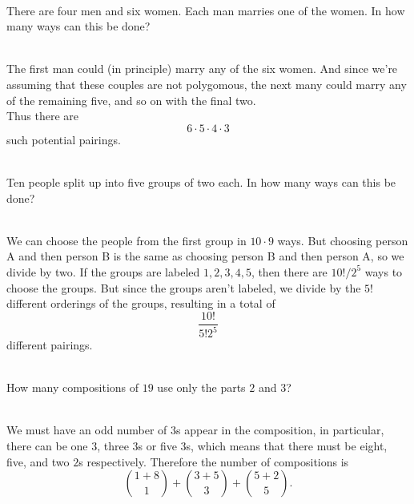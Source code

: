 \documentclass{article}
\newenvironment{problem}[2][Problem]{\begin{trivlist}
\item[\hskip \labelsep {\bfseries #1}\hskip \labelsep {\bfseries #2.}]}{\end{trivlist}}
\newenvironment{solution}[1][Solution.]{\begin{trivlist}
\item[\hskip \labelsep {\bfseries #1}]}{\end{trivlist}}
\begin{document}
\begin{problem}{2 (f)} \text{} \\
  There are four men and six women. Each man marries one of the women.
  In how many ways can this be done?
\end{problem}

\begin{solution} \text{} \\
  The first man could (in principle) marry any of the six women. And since
  we're assuming that these couples are not polygomous, the next many could
  marry any of the remaining five, and so on with the final two.\\
  Thus there are \[
    6\cdot5\cdot4\cdot3
  \] such potential pairings.
\end{solution}

\begin{problem}{2 (g)} \text{} \\
  Ten people split up into five groups of two each. In how many ways can this
  be done?
\end{problem}

\begin{solution} \text{} \\
  We can choose the people from the first group in $10 \cdot 9$ ways. But choosing
  person A and then person B is the same as choosing person B and then person A,
  so we divide by two.
  If the groups are labeled $1, 2, 3, 4, 5$, then there are $10!/2^5$ ways to
  choose the groups. But since the groups aren't labeled, we divide by the $5!$
  different orderings of the groups, resulting in a total of \[
    \frac{10!}{5!2^5}
  \] different pairings.
\end{solution}

\begin{problem}{2 (h)} \text{} \\
  How many compositions of $19$ use only the parts $2$ and $3$?
\end{problem}

\begin{solution} \text{} \\
  We must have an odd number of $3$s appear in the composition, in particular,
  there can be one $3$, three $3$s or five $3$s, which means that there must be
  eight, five, and two $2$s respectively. Therefore the number of compositions
  is \[
    \binom{1 + 8}{1} + \binom{3 + 5}{3} + \binom{5 + 2}{5}.
  \]
\end{solution}
\end{document}

